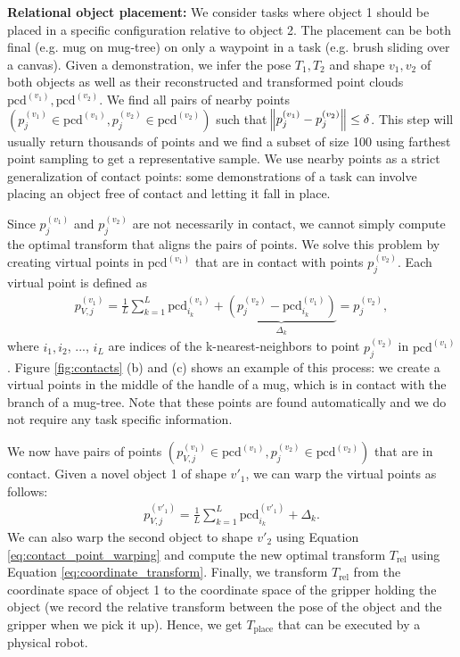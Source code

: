 \documentclass{article}
\newcommand{\pcx}[1]{\mathrm{pcd}^{(#1)}}
\begin{document}
\textbf{Relational object placement:} We consider tasks where object 1 should be placed in a specific configuration relative to object 2. The placement can be both final (e.g. mug on mug-tree) on only a waypoint in a task (e.g. brush sliding over a canvas). Given a demonstration, we infer the pose $T_1, T_2$ and shape $v_1, v_2$ of both objects as well as their reconstructed and transformed point clouds $\pcx{v_1}, \pcx{v_2}$. We find all pairs of nearby points $(p^{(v_1)}_j \in \pcx{v_1}, p^{(v_2)}_j \in \pcx{v_2})$ such that $\norm{p^{(v_1)}_j - p^{(v_2)}_j} \leq \delta$. This step will usually return thousands of points and we find a subset of size 100 using farthest point sampling \cite{eldar94farthest} to get a representative sample. We use nearby points as a strict generalization of contact points: some demonstrations of a task can involve placing an object free of contact and letting it fall in place.

Since $p^{(v_1)}_j$ and $p^{(v_2)}_j$ are not necessarily in contact, we cannot simply compute the optimal transform that aligns the pairs of points. We solve this problem by creating virtual points in $\pcx{v_1}$ that are in contact with points $p^{(v_2)}_j$. Each virtual point is defined as
\begin{align}
    p^{(v_1)}_{V,j} = \frac{1}{L} \sum_{k=1}^L \pcx{v_1}_{i_k} + \underbrace{(p^{(v_2)}_j - \pcx{v_1}_{i_k})}_{\Delta_k} = p^{(v_2)}_j,
\end{align}
where $i_1, i_2$, ..., $i_L$ are indices of the k-nearest-neighbors to point $p^{(v_2)}_j$ in $\pcx{v_1}$. Figure \ref{fig:contacts} (b) and (c) shows an example of this process: we create a virtual points in the middle of the handle of a mug, which is in contact with the branch of a mug-tree. Note that these points are found automatically and we do not require any task specific information.

We now have pairs of points $(p^{(v_1)}_{V,j} \in \pcx{v_1}, p^{(v_2)}_j \in \pcx{v_2})$ that are in contact. Given a novel object 1 of shape $v'_1$, we can warp the virtual points as follows:
\begin{align}
    p^{(v'_1)}_{V,j} = \frac{1}{L} \sum_{k=1}^L \pcx{v'_1}_{i_k} + \Delta_k.
\end{align}
We can also warp the second object to shape $v'_2$ using Equation \ref{eq:contact_point_warping} and compute the new optimal transform $T_{\text{rel}}$ using Equation \ref{eq:coordinate_transform}. Finally, we transform $T_{\text{rel}}$ from the coordinate space of object 1 to the coordinate space of the gripper holding the object (we record the relative transform between the pose of the object and the gripper when we pick it up). Hence, we get $T_{\text{place}}$ that can be executed by a physical robot.
\end{document}
